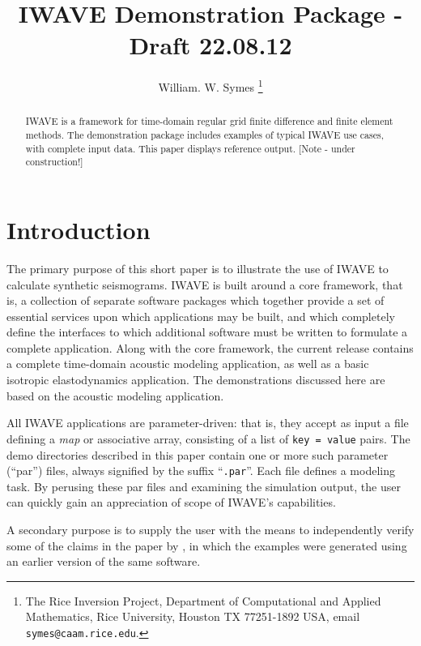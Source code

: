\documentclass [12pt]{georeport}
\begin{document}
\title{IWAVE Demonstration Package - Draft 22.08.12}
\author{William. W. Symes \thanks{The Rice Inversion Project,
Department of Computational and Applied Mathematics, Rice University,
Houston TX 77251-1892 USA, email {\tt symes@caam.rice.edu}.}}

\maketitle
\parskip 12pt
\begin{abstract}
IWAVE is a framework for time-domain regular grid finite difference and finite element methods. The demonstration package includes examples of typical IWAVE use cases, with complete input data. This paper displays reference output. [Note - under construction!]
\end{abstract}

\section{Introduction}
The primary purpose of this short paper is to illustrate the use of IWAVE to calculate synthetic seismograms. IWAVE is built around a core framework, that is, a collection of separate software packages which together provide a set of essential services upon which applications may be built, and which completely define the interfaces to which additional software must be written to formulate a complete application. Along with the core framework, the current release contains a complete time-domain acoustic modeling application, as well as a basic isotropic elastodynamics application.
The demonstrations discussed here are based on the acoustic modeling application.

All IWAVE applications are parameter-driven: that is, they accept as input a file defining a {\em map} or associative array, consisting of a list of {\tt key = value} pairs. The demo directories described in this paper contain one or more such parameter (``par'') files, always signified by the suffix ``{\tt .par}''. Each file defines a modeling task. By perusing these par files and examining the simulation output, the user can quickly gain an appreciation of scope of IWAVE's capabilities. 

A secondary purpose is to supply the user with the means to independently verify some of the claims in the paper by \cite{SymesVdovina:09}, in which the examples were generated using an earlier version of the same software.
\end{document}
